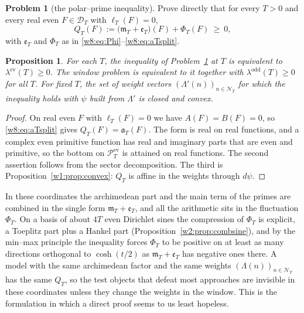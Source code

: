 \documentclass[11pt]{amsart}
\newtheorem{proposition}[theorem]{Proposition}
\theoremstyle{definition}
\newtheorem{problem}[theorem]{Problem}
\theoremstyle{remark}
\numberwithin{equation}{section}
\newcommand{\PT}{\mathcal{P}_T}                        %
\newcommand{\DT}{\mathcal{D}_T}                        %
\newcommand{\NT}{\mathcal{N}_T}                        %
\newcommand{\mT}{\mathfrak{m}_T}                       %
\newcommand{\aT}{\mathfrak{a}_T}                       %
\begin{document}
\begin{problem}[the polar--prime inequality]\label{w8:prob:polarprime}
Prove directly that for every $T>0$ and every real even $F\in\DT$ with $\ell_T(F)=0$,
\[
Q_T(F):=\bigl(\mT+\mathfrak e_T\bigr)(F)+\Phi_T(F)\ \ge\ 0 ,
\]
with $\mathfrak e_T$ and $\Phi_T$ as in \eqref{w8:eq:Phi}--\eqref{w8:eq:aTsplit}.
\end{problem}

\begin{proposition}\label{w8:prop:polarprime}
For each $T$, the inequality of Problem~\ref{w8:prob:polarprime} at $T$ is equivalent to
$\lambda^{\mathrm{ev}}(T)\ge0$. The window problem is equivalent to it together with
$\lambda^{\mathrm{odd}}(T)\ge0$ for all $T$. For fixed $T$, the set of weight vectors $(\Lambda'(n))_{n\in\NT}$
for which the inequality holds with $\psi$ built from $\Lambda'$ is closed and convex.
\end{proposition}

\begin{proof}
On real even $F$ with $\ell_T(F)=0$ we have $A(F)=B(F)=0$, so \eqref{w8:eq:aTsplit} gives $Q_T(F)=\aT(F)$. The form
is real on real functions, and a complex even primitive function has real and imaginary parts that are even and
primitive, so the bottom on $\PT^{\mathrm{ev}}$ is attained on real functions. The second assertion follows from the
sector decomposition. The third is Proposition~\ref{w1:prop:convex}: $Q_T$ is affine in the weights through
$d\psi$.
\end{proof}

In these coordinates the archimedean part and the main term of the primes are combined in the single form
$\mT+\mathfrak e_T$, and all the arithmetic sits in the fluctuation $\Phi_T$. On a basis of about $4T$ even
Dirichlet sines the compression of $\Phi_T$ is explicit, a Toeplitz part plus a Hankel part
(Proposition~\ref{w2:prop:combsine}), and by the min--max principle the inequality forces $\Phi_T$ to be positive
on at least as many directions orthogonal to $\cosh(t/2)$ as $\mT+\mathfrak e_T$ has negative ones there. A model
with the same archimedean factor and the same weights $(\Lambda(n))_{n\in\NT}$ has the same $Q_T$, so the test
objects that defeat most approaches are invisible in these coordinates unless they change the weights in the
window. This is the formulation in which a direct proof seems to us least hopeless.
\end{document}
